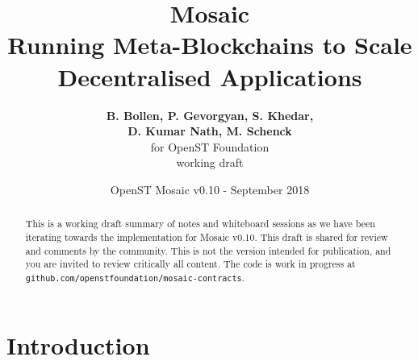 \documentclass[12pt,a4paper]{article}
\title{Mosaic\\\sc\Large{Running Meta-Blockchains to Scale Decentralised Applications}}
\author{\textbf{B. Bollen, P. Gevorgyan, S. Khedar,}\\ \textbf{D. Kumar Nath, M. Schenck}\\ for OpenST Foundation \\ working draft}
\date{OpenST Mosaic v0.10 - September 2018}
\begin{document}
\maketitle

\begin{abstract}
This is a working draft summary of notes and whiteboard sessions as we have been iterating towards the implementation for Mosaic v0.10. This draft is shared for review and comments by the community. This is not the version intended for publication, and you are invited to review critically all content. The code is work in progress at \verb|github.com/openstfoundation/mosaic-contracts|.
\end{abstract}

%
%
\section{Introduction}

%
%
%
% 
% 
% 
%
\end{document}
